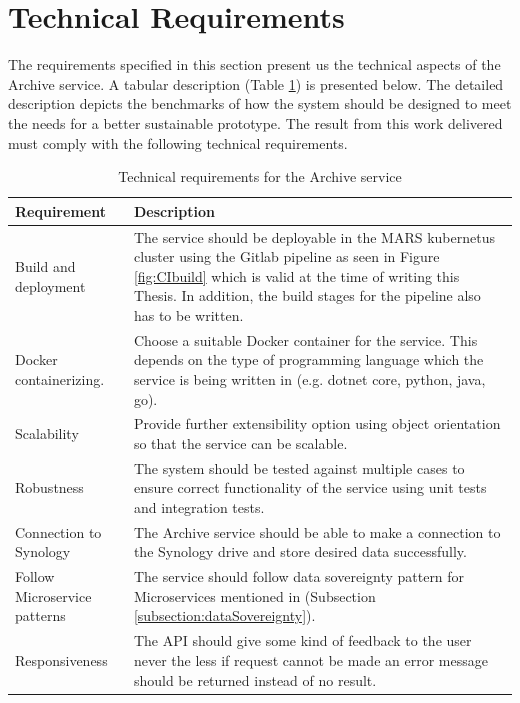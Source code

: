 \section{Technical Requirements}
The requirements specified in this section present us the technical aspects of the Archive service. A tabular description 
(Table \ref{table: Technical Requirements}) is presented below.
The detailed description depicts the benchmarks of how the system should be designed to meet the needs for a better sustainable prototype.
The result from this work delivered must comply with the following technical requirements.

    \begin{table}[h!]
        \centering
        \begin{tabular}{|p{3cm}||p{12cm}|}
            \hline
                \textbf{Requirement}  & \textbf{Description}\\
            \hline
                 Build and deployment & 
                 The service should be deployable in the MARS kubernetus \cite{kubernetes} cluster using the Gitlab pipeline as seen in Figure \ref{fig:CIbuild}
                 which is valid at the time of writing this Thesis. In addition,
                 the build stages for the pipeline also has to be written. \\
            \hline
                Docker containerizing.
                & Choose a suitable Docker container \cite[p.~7 - 8]{Torre2017} for the service. This depends on the type of programming language which 
                the service is being
                written in (e.g. dotnet core, python, java, go).\\
            \hline
                 Scalability & Provide further extensibility option using object orientation so that the service can be scalable.\\
            \hline
                 Robustness & The system should be tested against multiple cases to ensure correct functionality of the service using unit tests and
                 integration tests.\\    
            \hline
                 Connection to Synology & The Archive service should be able to make a connection to the Synology drive and store desired data successfully.\\    
            \hline
                Follow Microservice patterns & The service should follow data sovereignty pattern for Microservices mentioned in 
                (Subsection \ref{subsection:dataSovereignty}).\\ 
            \hline
                Responsiveness & The API should give some kind of feedback to the user never the less if request cannot be made an 
                error message should be returned instead of no result. \\      
            \hline
        \end{tabular}
        \caption{Technical requirements for the Archive service}
        \label{table: Technical Requirements}     
    \end{table}    
  
